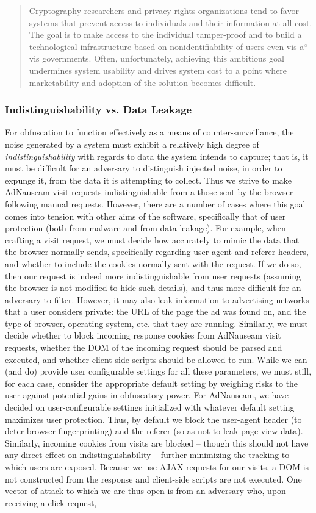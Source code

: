 \documentclass[conference]{IEEEtran}
\begin{document}
\blockquote{Cryptography researchers and privacy rights organizations tend to favor systems that prevent access to individuals and their information at all cost. The goal is to make access to the individual tamper-proof and to build a technological infrastructure based on nonidentifiability of users even vis-a“-vis governments. Often, unfortunately, achieving this ambitious goal undermines system usability and drives system cost to a point where marketability and adoption of the solution becomes difficult.\cite{Spiekermann}}

\subsubsection{Indistinguishability vs. Data Leakage}

For obfuscation to function effectively as a means of counter-surveillance, the noise generated by a system must exhibit a relatively high degree of \emph{indistinguishability} with regards to data the system intends to capture; that is, it must be difficult for an adversary to distinguish injected noise, in order to expunge it, from the data it is attempting to collect. \cite{Gervais,Balsa} Thus we strive to make AdNauseam visit requests indistinguishable from a those sent by the browser following manual requests. However, there are a number of cases where this goal comes into tension with other aims of the software, specifically that of user protection (both from malware and from data leakage). For example, when crafting a visit request, we must decide how accurately to mimic the data that the browser normally sends, specifically regarding user-agent and referer headers, and whether to include the cookies normally sent with the request. If we do so, then our request is indeed more indistinguishable from user requests (assuming the browser is not modified to hide such details), and thus more difficult for an adversary to filter. However, it may also leak information to advertising networks that a user considers private: the URL of the page the ad was found on, and the type of browser, operating system, etc. that they are running. Similarly, we must decide whether to block incoming response cookies from AdNauseam visit requests, whether the DOM of the incoming request should be parsed and executed, and whether client-side scripts should be allowed to run. While we can (and do) provide user configurable settings for all these parameters, we must still, for each case, consider the appropriate default setting by weighing risks to the user against potential gains in obfuscatory power. For AdNauseam, we have decided on user-configurable settings initialized with whatever default setting maximizes user protection. Thus, by default we block the user-agent header (to deter browser fingerprinting) and the referer (so as not to leak page-view data). Similarly, incoming cookies from visits are blocked -- though this should not have any direct effect on indistinguishability -- further minimizing the tracking to which users are exposed. Because we use AJAX requests for our visits, a DOM is not constructed from the response and client-side scripts are not executed. One vector of attack to which we are thus open is from an adversary who, upon receiving a click request, 
\end{document}
